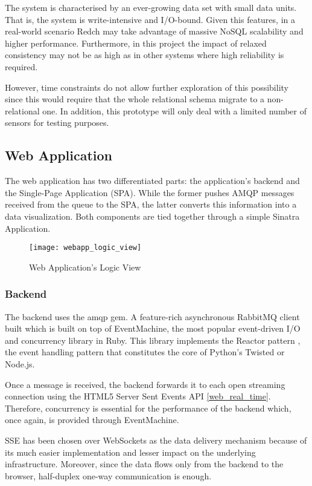 The system is characterised by an ever-growing data set with small data units. That is, the system is write-intensive and I/O-bound. Given this features, in a real-world scenario Redch may take advantage of massive NoSQL scalability and higher performance. Furthermore, in this project the impact of relaxed consistency may not be as high as in other systems where high reliability is required.

However, time constraints do not allow further exploration of this possibility since this would require that the whole relational schema migrate to a non-relational one. In addition, this prototype will only deal with a limited number of sensors for testing purposes.

\subsection{Web Application}

The web application has two differentiated parts: the application's backend and the Single-Page Application (SPA). While the former pushes AMQP messages received from the queue to the SPA, the latter converts this information into a data visualization. Both components are tied together through a simple Sinatra Application.

\begin{figure}[h]
	\centering
	\texttt{[image: webapp\_logic\_view]}
	\caption{Web Application's Logic View}
	\label{fig:webapp_logic_view}
\end{figure}

\subsubsection{Backend}

The backend uses the amqp gem. A feature-rich asynchronous RabbitMQ client built which is built on top of EventMachine, the most popular event-driven I/O and concurrency library in Ruby. This library implements the Reactor pattern \cite{reactor}, the event handling pattern that constitutes the core of Python's Twisted or Node.js.

Once a message is received, the backend forwards it to each open streaming connection using the HTML5 Server Sent Events API \ref{web_real_time}. Therefore, concurrency is essential for the performance of the backend which, once again, is provided through EventMachine.

SSE has been chosen over WebSockets as the data delivery mechanism because of its much easier implementation and lesser impact on the underlying infrastructure. Moreover, since the data flows only from the backend to the browser, half-duplex one-way communication is enough.

